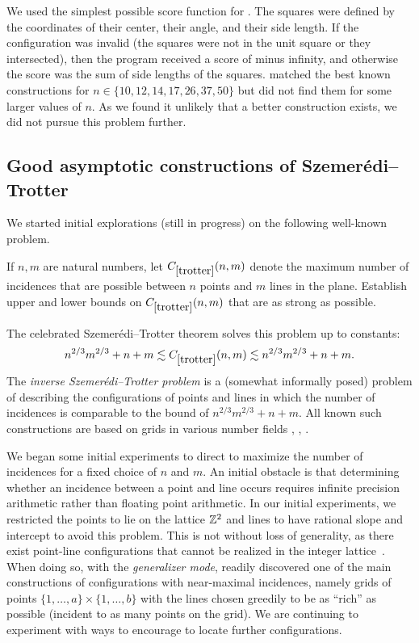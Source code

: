 We used the simplest possible score function for \AlphaEvolve. The squares were defined by the coordinates of their center, their angle, and their side length. If the configuration was invalid (the squares were not in the unit square or they intersected), then the program received a score of minus infinity, and otherwise the score was the sum of side lengths of the squares. \AlphaEvolve matched the best known constructions for $n\in \{ 10, 12, 14, 17, 26, 37, 50\}$ but did not find them for some larger values of $n$. As we found it unlikely that a better construction exists, we did not pursue this problem further.




\subsection{Good asymptotic constructions of Szemer\'edi--Trotter} 

We started initial explorations (still in progress) on the following well-known problem.

\renewcommand{\problemURL}{https://google-deepmind.github.io/alphaevolve_repository_of_problems/problems/56.html}

\begin{problem}\label{trotter}  If $n,m$ are natural numbers, let $C_{\ref{trotter}}(n,m)$ denote the maximum number of incidences that are possible between $n$ points and $m$ lines in the plane.  Establish upper and lower bounds on $C_{\ref{trotter}}(n,m)$ that are as strong as possible.
\end{problem}

The celebrated Szemer\'edi--Trotter theorem \cite{szemeredi-trotter} solves this problem up to constants:
$$ n^{2/3} m^{2/3} + n + m \lesssim C_{\ref{trotter}}(n,m) \lesssim n^{2/3} m^{2/3} + n + m.$$
The \emph{inverse Szemer\'edi--Trotter problem} is a (somewhat informally posed) problem of describing the configurations of points and lines in which the number of incidences is comparable to the bound of $n^{2/3} m^{2/3} + n + m$.  All known such constructions are based on grids in various number fields \cite{balko}, \cite{guth-silier}, \cite{currier}.

We began some initial experiments to direct \AlphaEvolve to maximize the number of incidences for a fixed choice of $n$ and $m$.  An initial obstacle is that determining whether an incidence between a point and line occurs requires infinite precision arithmetic rather than floating point arithmetic.  In our initial experiments, we restricted the points to lie on the lattice $\mathbb{Z}^2$ and lines to have rational slope and intercept to avoid this problem. This is not without loss of generality, as there exist point-line configurations that cannot be realized in the integer lattice~\cite{solymosi2025perles}.  When doing so, with the \emph{generalizer mode}, \AlphaEvolve readily discovered one of the main constructions of configurations with near-maximal incidences, namely grids of points $\{1,\dots,a\} \times \{1,\dots,b\}$ with the lines chosen greedily to be as ``rich'' as possible (incident to as many points on the grid).  We are continuing to experiment with ways to encourage \AlphaEvolve to locate further configurations.


